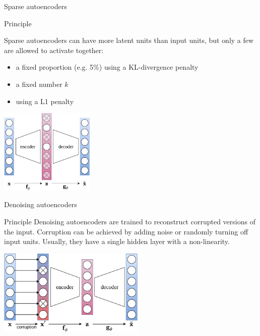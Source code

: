 \documentclass[handout]{beamer}
\begin{document}
  \begin{frame}{Sparse autoencoders}


    \begin{block}{Principle}
      \small{
      Sparse autoencoders can have more latent units than input units, but \alert{only a few are allowed to activate together}:
      \vspace{-0.25cm}
      \begin{itemize}
        \item a fixed proportion (e.g. 5\%) using a KL-divergence penalty \cite{Ng2011}
        \item a fixed number $k$ \cite{Makhzani2013}
        \item using a L1 penalty \cite{Arpit2016}
      \end{itemize}
      }
    \end{block}
    
    \centering
    \includegraphics[width=4.5cm]{rc/sparse-autoencoder}
    
  \end{frame}

  \begin{frame}{Denoising autoencoders}


    \begin{block}{Principle}
      Denoising autoencoders \cite{Vincent2010} are trained to reconstruct \alert{corrupted} versions of the input. Corruption can be achieved by adding noise or randomly turning off input units. Usually, they have a single hidden layer with a non-linearity.
    \end{block}

    \centering
    \includegraphics[width=7cm]{rc/denoising-autoencoder}
    
  \end{frame}
\end{document}
